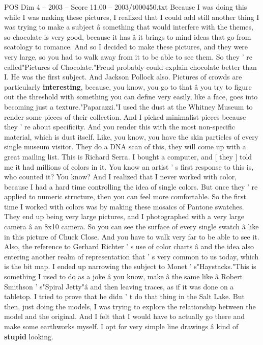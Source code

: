 \begin{textsample}{POS Dim 4 – 2003 – Score 11.00 – 2003/t000450.txt}
Because I was doing this while I was making these pictures, I realized that I could add still another thing I was trying to make a subject â something that would interfere with the themes, so chocolate is very good, because it has â it brings to mind ideas that go from scatology to romance.
And so I decided to make these pictures, and they were very large, so you had to walk away from it to be able to see them.
So they ' re called"Pictures of Chocolate."Freud probably could explain chocolate better than I.
He was the first subject.
And Jackson Pollock also.
Pictures of crowds are particularly \textbf{interesting}, because, you know, you go to that â you try to figure out the threshold with something you can define very easily, like a face, goes into becoming just a texture."Paparazzi."I used the dust at the Whitney Museum to render some pieces of their collection.
And I picked minimalist pieces because they ' re about specificity.
And you render this with the most non-specific material, which is dust itself.
Like, you know, you have the skin particles of every single museum visitor.
They do a DNA scan of this, they will come up with a great mailing list.
This is Richard Serra.
I bought a computer, and [ they ] told me it had millions of colors in it.
You know an artist ' s first response to this is, who counted it?
You know?
And I realized that I never worked with color, because I had a hard time controlling the idea of single colors.
But once they ' re applied to numeric structure, then you can feel more comfortable.
So the first time I worked with colors was by making these mosaics of Pantone swatches.
They end up being very large pictures, and I photographed with a very large camera â an 8x10 camera.
So you can see the surface of every single swatch â like in this picture of Chuck Close.
And you have to walk very far to be able to see it.
Also, the reference to Gerhard Richter ' s use of color charts â and the idea also entering another realm of representation that ' s very common to us today, which is the bit map.
I ended up narrowing the subject to Monet ' s"Haystacks."This is something I used to do as a joke â you know, make â the same like â Robert Smithson ' s"Spiral Jetty"â and then leaving traces, as if it was done on a tabletop.
I tried to prove that he didn ' t do that thing in the Salt Lake.
But then, just doing the models, I was trying to explore the relationship between the model and the original.
And I felt that I would have to actually go there and make some earthworks myself.
I opt for very simple line drawings â kind of \textbf{stupid} looking.

\end{textsample}
